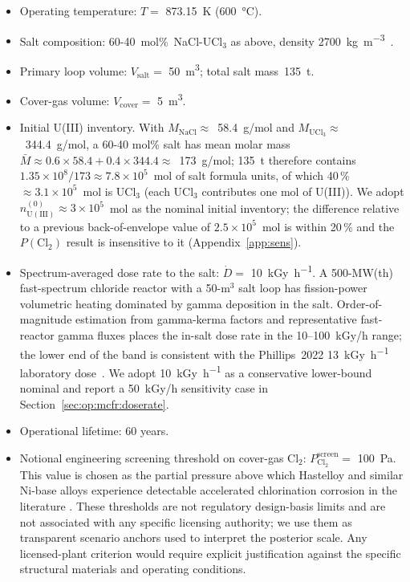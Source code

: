 \documentclass[11pt]{article}
\theoremstyle{plain}
\theoremstyle{definition}
\theoremstyle{remark}
\begin{document}
\begin{itemize}
\item Operating temperature: $T = $ \SI{873.15}{\kelvin} (\SI{600}{\celsius}).
\item Salt composition: 60-40~mol\%~NaCl-UCl$_3$ as above, density
      \SI{2700}{\kilogram\per\meter\cubed}~\citep{Janz1988,Sohal2010}.
\item Primary loop volume: $V_{\mathrm{salt}} = $ \SI{50}{\meter\cubed}; total
      salt mass~\SI{135}{\tonne}.
\item Cover-gas volume: $V_{\mathrm{cover}} = $ \SI{5}{\meter\cubed}.
\item Initial U(III) inventory.  With $M_{\mathrm{NaCl}} \approx$~58.4~g/mol
      and $M_{\mathrm{UCl_3}} \approx$~344.4~g/mol, a 60-40 mol\% salt has
      mean molar mass $\bar{M}\approx0.6\!\times\!58.4 + 0.4\!\times\!344.4
      \approx$~173~g/mol; 135~t therefore contains $1.35\!\times\!10^8 /
      173 \approx 7.8\!\times\!10^5$~mol of salt formula units, of which
      40\,\%~$\approx 3.1\!\times\!10^5$~mol is UCl$_3$ (each UCl$_3$
      contributes one mol of U(III)).  We adopt
      $n_{\mathrm{U(III)}}^{(0)} \approx 3\!\times\!10^5$~mol as the
      nominal initial inventory; the difference relative to a previous
      back-of-envelope value of $2.5\!\times\!10^5$~mol is within 20\,\%
      and the $P(\mathrm{Cl}_2)$ result is insensitive to it
      (Appendix~\ref{app:sens}).
\item Spectrum-averaged dose rate to the salt:
      $\dot{D} = $ \SI{10}{\kilo\gray\per\hour}.  A 500-MW(th)
      fast-spectrum chloride reactor with a 50-m$^3$ salt loop has
      fission-power volumetric heating dominated by gamma deposition in
      the salt.  Order-of-magnitude estimation from gamma-kerma factors
      and representative fast-reactor gamma fluxes places the in-salt
      dose rate in the 10--100~kGy/h range; the lower end of the band is
      consistent with the Phillips~2022 \SI{13}{\kilo\gray\per\hour}
      laboratory dose~\citep{Phillips2022,Sohal2010}.  We adopt
      \SI{10}{\kilo\gray\per\hour} as a conservative lower-bound nominal
      and report a 50~kGy/h sensitivity case in
      Section~\ref{sec:op:mcfr:doserate}.
\item Operational lifetime: 60 years.
\item Notional engineering screening threshold on cover-gas Cl$_2$:
      $P_{\mathrm{Cl_2}}^{\mathrm{screen}} = $
      \SI{100}{\pascal}.  This value is chosen as the partial pressure
      above which Hastelloy and similar Ni-base alloys experience
      detectable accelerated chlorination corrosion in the literature
      \citep{Sohal2010,Carotti2017,ForsbergSafety2019}.  These thresholds
      are not regulatory design-basis limits and are not associated with
      any specific licensing authority; we use them as transparent
      scenario anchors used to interpret the posterior scale.  Any
      licensed-plant criterion would require explicit justification
      against the specific structural materials and operating conditions.
\end{itemize}
\end{document}
